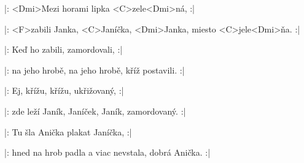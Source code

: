 

\zs
|: <Dmi>Mezi horami lipka <C>zele<Dmi>ná, :|

|: <F>zabili Janka, <C>Janíčka, <Dmi>Janka, miesto <C>jele<Dmi>ňa. :|
\ks

\zs
|: Keď ho zabili, zamordovali, :|

|: na jeho hrobě, na jeho hrobě, kříž postavili. :|
\ks

\zs
|: Ej, křížu, křížu, ukřižovaný, :|

|: zde leží Janík, Janíček, Janík, zamordovaný. :|
\ks

\zs
|: Tu šla Anička plakat Janíčka, :|

|: hned na hrob padla a viac nevstala, dobrá Anička. :|
\ks

\kp
